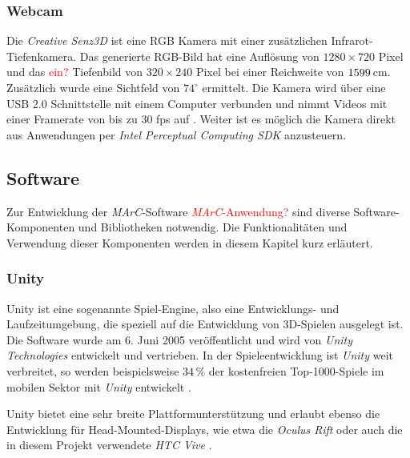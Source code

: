 \subsubsection{Webcam}\label{sec:webcam} 
Die \textit{Creative Senz3D} ist eine RGB Kamera mit einer zusätzlichen Infrarot-Tiefenkamera. Das generierte RGB-Bild hat eine Auflösung von $1280\times720$ Pixel und das \textcolor{red}{ein?} Tiefenbild von $320\times240$ Pixel bei einer Reichweite von $15\-99\,$cm. Zusätzlich wurde eine Sichtfeld von $74^\circ$ ermittelt. Die Kamera wird über eine USB 2.0 Schnittstelle mit einem Computer verbunden und nimmt Videos mit einer Framerate von bis zu $30$ fps auf \cite{website:Senz3d}. Weiter ist es möglich die Kamera direkt aus Anwendungen per \textit{Intel Perceptual Computing SDK} anzusteuern.

\subsection{Software} 
Zur Entwicklung der \textit{MArC}-Software \textcolor{red}{\textit{MArC}-Anwendung?} sind diverse Software-Komponenten und Bibliotheken notwendig. Die Funktionalitäten und Verwendung dieser Komponenten werden in diesem Kapitel kurz erläutert.


\subsubsection{Unity}\label{sec:unity}
Unity ist eine sogenannte Spiel-Engine, also eine Entwicklungs- und Laufzeitumgebung, die speziell auf die Entwicklung von 3D-Spielen ausgelegt ist. Die Software wurde am 6. Juni 2005 veröffentlicht \cite{haas2014history} und wird von \textit{Unity Technologies} \cite{website:Unity} entwickelt und vertrieben. In der Spieleentwicklung ist \textit{Unity} weit verbreitet, so werden beispielsweise $34\,\%$ der kostenfreien Top-1000-Spiele im mobilen Sektor mit \textit{Unity} entwickelt \cite{website:UnityPR}.

Unity bietet eine sehr breite Plattformunterstützung \cite{website:UnityMultiPlatform} und erlaubt ebenso die Entwicklung für Head-Mounted-Displays, wie etwa die \textit{Oculus Rift} \cite{website:UnityOculus}\cite{website:UnityVRoverview} oder auch die in diesem Projekt verwendete \textit{HTC Vive} \cite{website:UnityVRoverview}.


